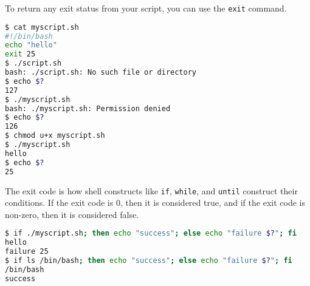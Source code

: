 To return any exit status from your script, you can use the \lstinline|exit| command.

\begin{lstlisting}[language=bash]
$ cat myscript.sh
#!/bin/bash
echo "hello"
exit 25
$ ./script.sh
bash: ./script.sh: No such file or directory
$ echo $?
127
$ ./myscript.sh
bash: ./myscript.sh: Permission denied
$ echo $?
126
$ chmod u+x myscript.sh
$ ./myscript.sh
hello
$ echo $?
25
\end{lstlisting}

The exit code is how shell constructs like \lstinline|if|, \lstinline|while|,
and \lstinline|until| construct their conditions. If the exit code is 0,
then it is considered true, and if the exit code is non-zero, then it
is considered false.

\begin{lstlisting}[language=bash]
$ if ./myscript.sh; then echo "success"; else echo "failure $?"; fi
hello
failure 25
$ if ls /bin/bash; then echo "success"; else echo "failure $?"; fi
/bin/bash
success
\end{lstlisting}

